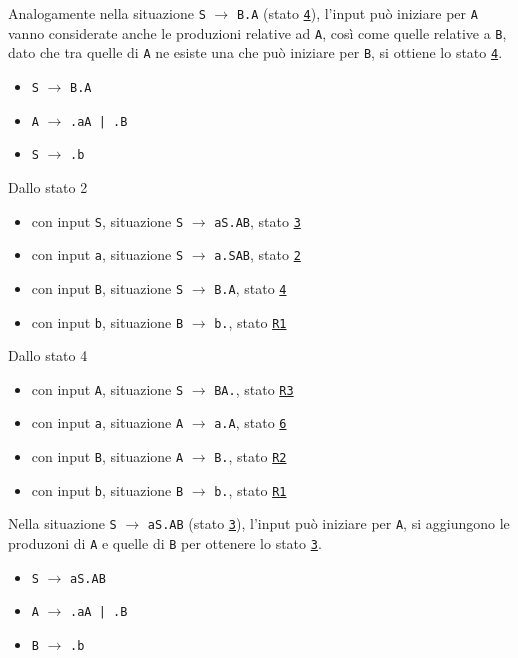 Analogamente nella situazione \texttt{S} $\rightarrow$ \texttt{B.A} (stato \texttt{\underline{4}}), l'input può iniziare per \texttt{A} vanno considerate anche le produzioni relative ad \texttt{A}, così come quelle relative a \texttt{B}, dato che tra quelle di \texttt{A} ne esiste una che può iniziare per \texttt{B}, si ottiene lo stato \texttt{\underline{4}}.
\begin{itemize}
    \item \texttt{S} $\rightarrow$ \texttt{B.A}
    \item \texttt{A} $\rightarrow$ \texttt{.aA | .B}
    \item \texttt{S} $\rightarrow$ \texttt{.b}
\end{itemize}
\setlist{}
Dallo stato 2
\begin{itemize}
    \item con input \texttt{S}, situazione \texttt{S} $\rightarrow$ \texttt{aS.AB}, stato \texttt{\underline{3}}
    \item con input \texttt{a}, situazione \texttt{S} $\rightarrow$ \texttt{a.SAB}, stato \texttt{\underline{2}}
    \item con input \texttt{B}, situazione \texttt{S} $\rightarrow$ \texttt{B.A}, stato \texttt{\underline{4}}
    \item con input \texttt{b}, situazione \texttt{B} $\rightarrow$ \texttt{b.}, stato \texttt{\underline{R1}}
\end{itemize}
Dallo stato 4
\begin{itemize}
    \item con input \texttt{A}, situazione \texttt{S} $\rightarrow$ \texttt{BA.}, stato \texttt{\underline{R3}}
    \item con input \texttt{a}, situazione \texttt{A} $\rightarrow$ \texttt{a.A}, stato \texttt{\underline{6}}
    \item con input \texttt{B}, situazione \texttt{A} $\rightarrow$ \texttt{B.}, stato \texttt{\underline{R2}}
    \item con input \texttt{b}, situazione \texttt{B} $\rightarrow$ \texttt{b.}, stato \texttt{\underline{R1}}
\end{itemize}

Nella situazione \texttt{S} $\rightarrow$ \texttt{aS.AB} (stato \texttt{\underline{3}}), l'input può iniziare per \texttt{A}, si aggiungono le produzoni di \texttt{A} e quelle di \texttt{B} per ottenere lo stato \texttt{\underline{3}}.
\begin{itemize}
    \item \texttt{S} $\rightarrow$ \texttt{aS.AB}
    \item \texttt{A} $\rightarrow$ \texttt{.aA | .B}
    \item \texttt{B} $\rightarrow$ \texttt{.b}
\end{itemize}
\setlist{}

